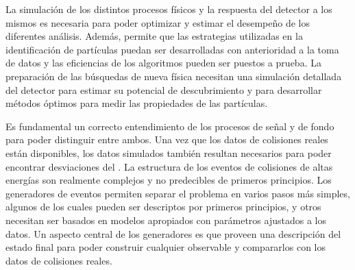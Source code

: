 La simulación de los distintos procesos físicos y la respuesta del detector a los mismos es necesaria para poder optimizar y estimar el desempeño de los diferentes análisis. Además, permite que las estrategias utilizadas en la identificación de partículas puedan ser desarrolladas con anterioridad a la toma de datos y las eficiencias de los algoritmos pueden ser puestos a prueba. La preparación de las búsquedas de nueva física necesitan una simulación detallada del detector para estimar su potencial de descubrimiento y para desarrollar métodos óptimos para medir las propiedades de las partículas.

Es fundamental un correcto entendimiento de los procesos de señal y de fondo para poder distinguir entre ambos. Una vez que los datos de colisiones reales están disponibles, los datos simulados también resultan necesarios para poder encontrar desviaciones del \ME.
La estructura de los eventos de colisiones de altas energías son realmente complejos y no predecibles de primeros principios. Los generadores de eventos permiten separar el problema en varios pasos más simples, algunos de los cuales pueden ser descriptos por primeros principios, y otros necesitan ser basados en modelos apropiados con parámetros ajustados a los datos. Un aspecto central de los generadores es que proveen una descripción del estado final para poder construir cualquier observable y compararlos con los datos de colisiones reales.
